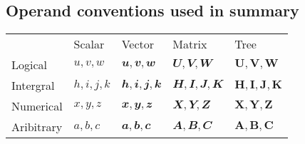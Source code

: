 \subsection{Operand conventions used in summary}
\begin{tabularx}{\textwidth}{ l l l l l }
	           & Scalar        & Vector                   & Matrix                   & Tree                   \\
	Logical    & \( u,v,w \)   & \( \mathbfit{u,v,w} \)   & \( \mathbfit{U,V,W} \)   & \( \mathbf{U,V,W} \)   \\
	Intergral  & \( h,i,j,k \) & \( \mathbfit{h,i,j,k} \) & \( \mathbfit{H,I,J,K} \) & \( \mathbf{H,I,J,K} \) \\
	Numerical  & \( x,y,z \)   & \( \mathbfit{x,y,z} \)   & \( \mathbfit{X,Y,Z} \)   & \( \mathbf{X,Y,Z} \)   \\
	Aribitrary & \( a,b,c \)   & \( \mathbfit{a,b,c} \)   & \( \mathbfit{A,B,C} \)   & \( \mathbf{A,B,C} \)   \\
\end{tabularx}

